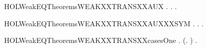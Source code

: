 \newcommand{\HOLWeakEQTheoremsWEAKXXTRANSXXANDXXEPS}{\UseVerbatim{HOLWeakEQTheoremsWEAKXXTRANSXXANDXXEPS}}
\begin{SaveVerbatim}{HOLWeakEQTheoremsWEAKXXTRANSXXAUX}
\HOLTokenTurnstile{} \HOLSymConst{\HOLTokenForall{}}  .
        \HOLTokenWeakTransBegin{} \HOLTokenWeakTransEnd {} \HOLSymConst{\HOLTokenImp{}}
       \HOLSymConst{\HOLTokenForall{}} .
             \HOLSymConst{\HOLTokenConj{}}    \HOLSymConst{\HOLTokenImp{}}
           \HOLSymConst{\HOLTokenExists{}}.  \HOLTokenWeakTransBegin{} \HOLTokenWeakTransEnd {} \HOLSymConst{\HOLTokenConj{}}   
\end{SaveVerbatim}
\newcommand{\HOLWeakEQTheoremsWEAKXXTRANSXXAUX}{\UseVerbatim{HOLWeakEQTheoremsWEAKXXTRANSXXAUX}}
\begin{SaveVerbatim}{HOLWeakEQTheoremsWEAKXXTRANSXXAUXXXSYM}
\HOLTokenTurnstile{} \HOLSymConst{\HOLTokenForall{}}  .
        \HOLTokenWeakTransBegin{} \HOLTokenWeakTransEnd {} \HOLSymConst{\HOLTokenImp{}}
       \HOLSymConst{\HOLTokenForall{}} .
             \HOLSymConst{\HOLTokenConj{}}    \HOLSymConst{\HOLTokenImp{}}
           \HOLSymConst{\HOLTokenExists{}}.  \HOLTokenWeakTransBegin{} \HOLTokenWeakTransEnd {} \HOLSymConst{\HOLTokenConj{}}   
\end{SaveVerbatim}
\newcommand{\HOLWeakEQTheoremsWEAKXXTRANSXXAUXXXSYM}{\UseVerbatim{HOLWeakEQTheoremsWEAKXXTRANSXXAUXXXSYM}}
\begin{SaveVerbatim}{HOLWeakEQTheoremsWEAKXXTRANSXXcasesOne}
\HOLTokenTurnstile{} \HOLSymConst{\HOLTokenForall{}}  .
        \HOLTokenWeakTransBegin{}\HOLTokenWeakTransEnd {} \HOLSymConst{\HOLTokenImp{}}
       (\HOLSymConst{\HOLTokenExists{}}.  \HOLTokenTransBegin\HOLConst{\ensuremath{\tau}}\HOLTokenTransEnd {} \HOLSymConst{\HOLTokenConj{}}  \HOLTokenWeakTransBegin{}\HOLTokenWeakTransEnd {}) \HOLSymConst{\HOLTokenDisj{}} \HOLSymConst{\HOLTokenExists{}}.  \HOLTokenTransBegin{}\HOLTokenTransEnd {} \HOLSymConst{\HOLTokenConj{}}   
\end{SaveVerbatim}
